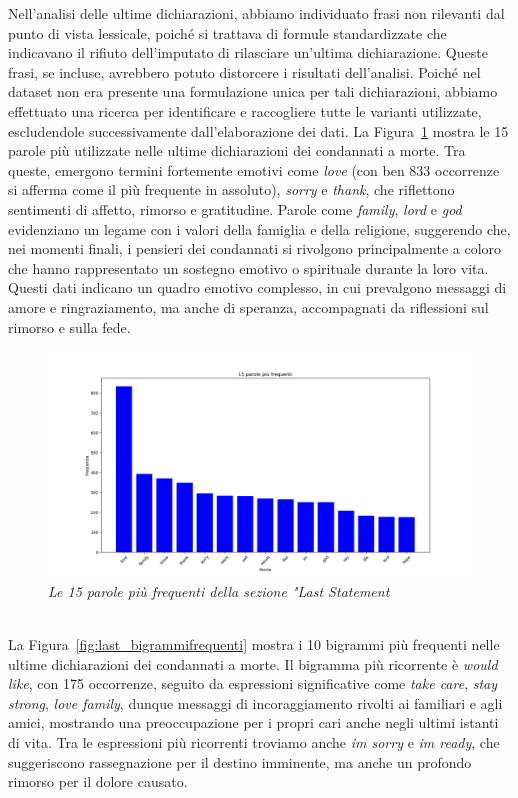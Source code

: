 \documentclass[11pt]{article}
\begin{document}
\begin{itemize}
    Nell’analisi delle ultime dichiarazioni, abbiamo individuato frasi non rilevanti dal punto di vista lessicale, poiché si trattava di formule standardizzate che indicavano il rifiuto dell’imputato di rilasciare un’ultima dichiarazione. Queste frasi, se incluse, avrebbero potuto distorcere i risultati dell’analisi. Poiché nel dataset non era presente una formulazione unica per tali dichiarazioni, abbiamo effettuato una ricerca per identificare e raccogliere tutte le varianti utilizzate, escludendole successivamente dall’elaborazione dei dati. 
   La Figura~\ref{fig:last_parolefrequenti} mostra le 15 parole più utilizzate nelle ultime dichiarazioni dei condannati a morte. Tra queste, emergono termini fortemente emotivi come \textit{love} (con ben 833 occorrenze si afferma come il più frequente in assoluto), \textit{sorry} e \textit{thank}, che riflettono sentimenti di affetto, rimorso e gratitudine. Parole come \textit{family}, \textit{lord} e \textit{god} evidenziano un legame con i valori della famiglia e della religione, suggerendo che, nei momenti finali, i pensieri dei condannati si rivolgono principalmente a coloro che hanno rappresentato un sostegno emotivo o spirituale durante la loro vita. Questi dati indicano un quadro emotivo complesso, in cui prevalgono messaggi di amore e ringraziamento, ma anche di speranza, accompagnati da riflessioni sul rimorso e sulla fede.
   \begin{figure}
       \centering
       \includegraphics[width=1\linewidth]{last_grafico_parole_frequenti.png}
       \caption{\textit{Le 15 parole più frequenti della sezione "Last Statement}}
       \label{fig:last_parolefrequenti}
   \end{figure}
   \\
   La Figura~\ref{fig:last_bigrammifrequenti} mostra i 10 bigrammi più frequenti nelle ultime dichiarazioni dei condannati a morte. Il bigramma più ricorrente è \textit{would like}, con 175 occorrenze, seguito da espressioni significative come \textit{take care}, \textit{stay strong}, \textit{love family}, dunque messaggi di incoraggiamento rivolti ai familiari e agli amici, mostrando una preoccupazione per i propri cari anche negli ultimi istanti di vita. Tra le espressioni più ricorrenti troviamo anche \textit{im sorry} e \textit{im ready}, che suggeriscono rassegnazione per il destino imminente, ma anche un profondo rimorso per il dolore causato. 

\end{itemize}
\end{document}
